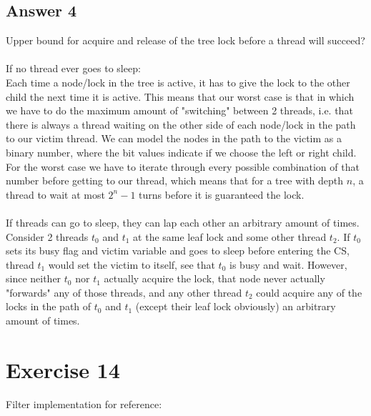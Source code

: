 \documentclass[a4paper,%
11pt,%
DIV=14,
headsepline,%
headings=normal,
]{scrartcl}
\newcommand{\exercise}[1]{\section*{Exercise #1}}
\newcommand{\answer}[1]{\subsection*{Answer #1}}
\begin{document}
\answer{4}
Upper bound for acquire and release of the tree lock before a thread will succeed?\\
\\
If no thread ever goes to sleep:\\
Each time a node/lock in the tree is active, it has to give the lock to the other child the next time it is active. This means that our worst case is that in which we have to do the maximum amount of "switching" between 2 threads, i.e. that there is always a thread waiting on the other side of each node/lock in the path to our victim thread. We can model the nodes in the path to the victim as a binary number, where the bit values indicate if we choose the left or right child. For the worst case we have to iterate through every possible combination of that number before getting to our thread, which means that for a tree with depth $n$, a thread to wait at most $2^n - 1$ turns before it is guaranteed the lock.\\
\\
If threads can go to sleep, they can lap each other an arbitrary amount of times.\\
Consider 2 threads $t_0$ and $t_1$ at the same leaf lock and some other thread $t_2$. If $t_0$ sets its busy flag and victim variable and goes to sleep before entering the CS, thread $t_1$ would set the victim to itself, see that $t_0$ is busy and wait. However, since neither $t_0$ nor $t_1$ actually acquire the lock, that node never actually "forwards" any of those threads, and any other thread $t_2$ could acquire any of the locks in the path of $t_0$ and $t_1$ (except their leaf lock obviously) an arbitrary amount of times.

\exercise{14}

Filter implementation for reference:\\
\end{document}
